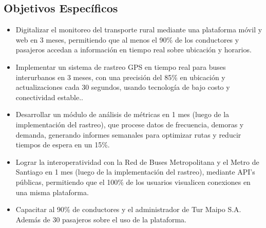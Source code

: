 \documentclass[12pt]{article}
\begin{document}
\subsection{Objetivos Específicos}
\begin{itemize}
    \item Digitalizar el monitoreo del transporte rural mediante una plataforma móvil y web en 3 meses, permitiendo que al menos el 90\% de los conductores y pasajeros accedan a información en tiempo real sobre ubicación y horarios.
    \item Implementar un sistema de rastreo GPS en tiempo real para buses interurbanos en 3 meses, con una precisión del 85\% en ubicación y actualizaciones cada 30 segundos, usando tecnología de bajo costo y conectividad estable..
    \item Desarrollar un módulo de análisis de métricas en 1 mes (luego de la implementación del rastreo), que procese datos de frecuencia, demoras y demanda, generando informes semanales para optimizar rutas y reducir tiempos de espera en un 15\%.
    \item Lograr la interoperatividad con la Red de Buses Metropolitana y el Metro de Santiago en 1 mes (luego de la implementación del rastreo), mediante API's públicas, permitiendo que el 100\% de los usuarios visualicen conexiones en una misma plataforma.
    \item Capacitar al 90\% de conductores y el administrador de Tur Maipo S.A. Además de 30 pasajeros sobre el uso de la plataforma.
\end{itemize}
\newpage
\end{document}

